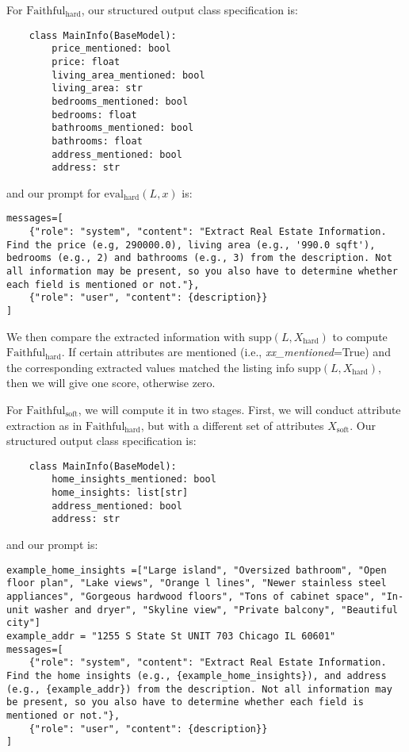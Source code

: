 For $\text{Faithful}_\text{hard}$, our structured output class specification is:
\begin{lstlisting}
    class MainInfo(BaseModel):
        price_mentioned: bool
        price: float
        living_area_mentioned: bool
        living_area: str
        bedrooms_mentioned: bool
        bedrooms: float
        bathrooms_mentioned: bool
        bathrooms: float
        address_mentioned: bool
        address: str
\end{lstlisting}
and our prompt for $\text{eval}_{\text{hard}}(L, x)$  is:
\begin{lstlisting}
messages=[
    {"role": "system", "content": "Extract Real Estate Information. Find the price (e.g, 290000.0), living area (e.g., '990.0 sqft'), bedrooms (e.g., 2) and bathrooms (e.g., 3) from the description. Not all information may be present, so you also have to determine whether each field is mentioned or not."},
    {"role": "user", "content": {description}}
]
\end{lstlisting}

We then compare the extracted information with $\text{supp}(L, X_{\text{hard}})$ to compute $\text{Faithful}_\text{hard}$. If certain attributes are mentioned (i.e., \textit{xx\_mentioned}=True) and the corresponding extracted values matched the listing info $\text{supp}(L, X_{\text{hard}})$, then we will give one score, otherwise zero.  

For $\text{Faithful}_\text{soft}$, we will compute it in two stages. First, we will conduct attribute extraction as in $\text{Faithful}_\text{hard}$, but with a different set of attributes $X_\text{soft}$. Our structured output class specification is:
\begin{lstlisting}
    class MainInfo(BaseModel):
        home_insights_mentioned: bool
        home_insights: list[str]
        address_mentioned: bool
        address: str
\end{lstlisting}
and our prompt is:
\begin{lstlisting}
example_home_insights =["Large island", "Oversized bathroom", "Open floor plan", "Lake views", "Orange l lines", "Newer stainless steel appliances", "Gorgeous hardwood floors", "Tons of cabinet space", "In-unit washer and dryer", "Skyline view", "Private balcony", "Beautiful city"]
example_addr = "1255 S State St UNIT 703 Chicago IL 60601"
messages=[
    {"role": "system", "content": "Extract Real Estate Information. Find the home insights (e.g., {example_home_insights}), and address (e.g., {example_addr}) from the description. Not all information may be present, so you also have to determine whether each field is mentioned or not."},
    {"role": "user", "content": {description}}
]    
\end{lstlisting}

